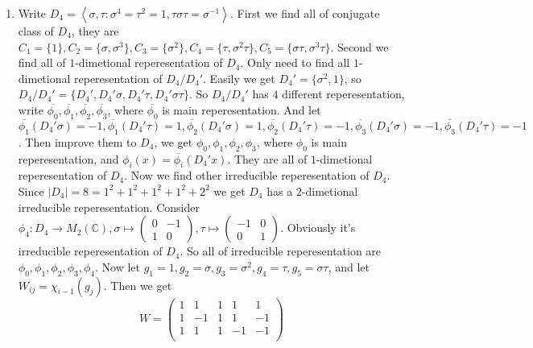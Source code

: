 \documentclass{ctexart}
\begin{document}
\begin{solution}
  \begin{enumerate}
    \item Write \(D_4=\left\langle \sigma,\tau:\sigma^4=\tau^2=1,\tau \sigma \tau = \sigma^{-1}\right\rangle \).
          First we find all of conjugate class of \(D_4\), they are \(C_1=\{1\},C_2=\{\sigma,\sigma^3\},C_3=\{\sigma^2\},C_4=\{\tau,\sigma^2 \tau\},C_5=\{\sigma \tau,\sigma^3 \tau\}\).
          Second we find all of \(1\)-dimetional reperesentation of \(D_4\). Only need to find all \(1\)-dimetional reperesentation of \(D_4/D_4'\).
          Easily we get \(D_4'=\{\sigma^2,1\}\), so \(D_4/D_4'=\{D_4',D_4'\sigma,D_4'\tau,D_4'\sigma \tau\}\).
          So \(D_4/D_4'\) has \(4\) different reperesentation, write \(\overline{\phi_0},\overline{\phi_1},\overline{\phi_2},\overline{\phi_3}\), where \(\overline{\phi_0}\) is main reperesentation.
          And let \(\overline{\phi_1}(D_4'\sigma)=-1,\overline{\phi_1}(D_4'\tau)=1,\overline{\phi_2}(D_4'\sigma)=1,\overline{\phi_2}(D_4'\tau)=-1,\overline{\phi_3}(D_4'\sigma)=-1,\overline{\phi_3}(D_4'\tau)=-1\).
          Then improve them to \(D_4\), we get \(\phi_0,\phi_1,\phi_2,\phi_3\), where \(\phi_0\) is main reperesentation, and
          \(\phi_i(x)=\overline{\phi_i}(D_4'x)\). They are all of \(1\)-dimetional reperesentation of \(D_4\).
          Now we find other irreducible reperesentation of \(D_4\).
          Since \(|D_4|=8=1^2+1^2+1^2+1^2+2^2\) we get \(D_4\) has a \(2\)-dimetional irreducible reperesentation.
          Consider \(\phi_4:D_4 \to M_2(\mathbb{C}),\sigma \mapsto \begin{pmatrix}
            0 & -1 \\
            1 & 0
          \end{pmatrix},\tau \mapsto \begin{pmatrix}
            -1 & 0 \\
            0  & 1
          \end{pmatrix}\).
          Obviously it's irreducible reperesentation of \(D_4\).
          So all of irreducible reperesentation are \(\phi_0,\phi_1,\phi_2,\phi_3,\phi_4\).
          Now let \(g_1=1,g_2=\sigma,g_3=\sigma^2,g_4=\tau,g_5=\sigma \tau\), and let \(W_{ij}=\chi_{i-1}( g_j)\).
          Then we get
          \[
            W=\begin{pmatrix}
              1 & 1  & 1  & 1  & 1  \\
              1 & -1 & 1  & 1  & -1 \\
              1 & 1  & 1  & -1 & -1 \\

\end{pmatrix}\]
\end{enumerate}
\end{solution}
\end{document}
